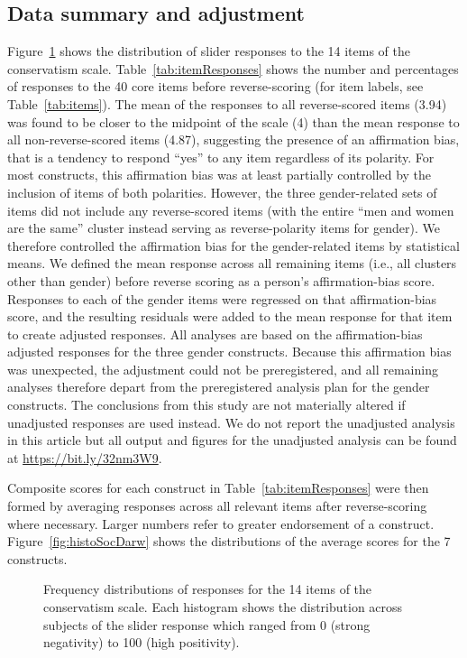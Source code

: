 \documentclass[fignum,man]{apa}\usepackage[]{graphicx}\usepackage[]{color}
\begin{document}
\subsection{Data summary and adjustment}
Figure~\ref{fig:slidersSocDarw} shows the distribution
of slider responses to the 14 items of the conservatism scale.
Table~\ref{tab:itemResponses}
shows the number and percentages of responses to the 40 core
items before
reverse-scoring (for item labels, see Table~\ref{tab:items}).
The mean of the responses to all reverse-scored items (3.94)
was found to be 
closer to the midpoint of the scale (4) than the mean response to all non-reverse-scored
items (4.87), suggesting the presence of an
affirmation bias, that is a tendency to respond ``yes'' to any item regardless of
its polarity. For most constructs, this affirmation bias was at least partially controlled
by the inclusion of items of both polarities. However, the three gender-related sets 
of items did not include any reverse-scored items (with the entire ``men and women are the same''
cluster instead serving as reverse-polarity items for gender). We therefore
controlled the affirmation
bias for the gender-related items by statistical means.
We defined the mean response across all remaining items (i.e., all clusters other than
gender) before reverse scoring
as a person's affirmation-bias score. Responses to each of the gender items were regressed
on that affirmation-bias score, and the resulting residuals were added
to the mean response for that item to create adjusted responses. All
analyses are based on the affirmation-bias adjusted responses for the three 
gender constructs.
Because this affirmation bias was unexpected, the
adjustment could not be preregistered, and all remaining analyses
therefore depart from the preregistered analysis plan for the gender
constructs. The conclusions from this study are not materially altered if 
unadjusted responses are used instead. We do not report the 
unadjusted analysis in this article but all output and figures for the unadjusted
analysis can be found at \url{https://bit.ly/32nm3W9}.

Composite scores for each construct in Table~\ref{tab:itemResponses}
 were then formed by averaging 
responses across
all relevant items after reverse-scoring where necessary. 
Larger numbers refer to greater endorsement of a construct. 
Figure~\ref{fig:histoSocDarw} shows the distributions 
of the average scores for the 7 constructs. 
\begin{figure}[tp] %
	\caption{Frequency distributions of responses for the
		14 items of the conservatism scale.
		Each histogram shows the distribution
		across subjects of the slider response which
		ranged from 0 (strong negativity) to 100 (high positivity). }
	\label{fig:slidersSocDarw}
\end{figure}
\end{document}
